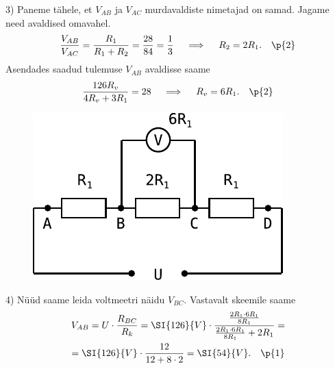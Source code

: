 3) Paneme tähele, et $V_{AB}$ ja $V_{AC}$ murdavaldiste nimetajad on samad. Jagame need avaldised omavahel.
\[
\frac{V_{AB}}{V_{AC}}=\frac{R_1}{R_1+R_2}=\frac{28}{84}=\frac{1}{3} \quad\implies\quad R_2=2R_1. \quad \p{2}
\]
Asendades saadud tulemuse $V_{AB}$ avaldisse saame
\[
\frac{126 R_v}{4R_v+3R_1}=28\quad\implies\quad R_v=6R_1. \quad \p{2}
\]

\begin{figure}
\vspace{-2em}
  \begin{center}
    \includegraphics[width=1\linewidth]{2023-v2g-07-sol3.pdf}
  \end{center}
\vspace{-5em}
\end{figure}

4) Nüüd saame leida voltmeetri näidu $V_{BC}$. Vastavalt skeemile saame
\begin{multline*}
V_{AB}=U\cdot\frac{R_{BC}}{R_k}=\SI{126}{V}\cdot\frac{\frac{2R_1\cdot6R_1}{8R_1}}{\frac{2R_1\cdot6R_1}{8R_1}+2R_1}=\\
=\SI{126}{V}\cdot\frac{12}{12+8\cdot2}=\SI{54}{V}. \quad \p{1}
\end{multline*}
\probend
